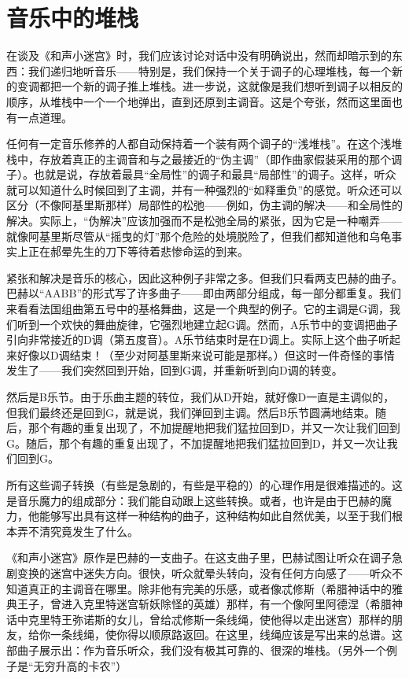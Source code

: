 \section{音乐中的堆栈}

在谈及《和声小迷宫》时，我们应该讨论对话中没有明确说出，然而却暗示到的东西：我们递归地听音乐——特别是，我们保持一个关于调子的心理堆栈，每一个新的变调都把一个新的调子推上堆栈。进一步说，这就像是我们想听到调子以相反的顺序，从堆栈中一个一个地弹出，直到还原到主调音。这是个夸张，然而这里面也有一点道理。

任何有一定音乐修养的人都自动保持着一个装有两个调子的“浅堆栈”。在这个浅堆栈中，存放着真正的主调音和与之最接近的“伪主调”（即作曲家假装采用的那个调子）。也就是说，存放着最具“全局性”的调子和最具“局部性”的调子。这样，听众就可以知道什么时候回到了主调，并有一种强烈的“如释重负”的感觉。听众还可以区分（不像阿基里斯那样）局部性的松弛——例如，伪主调的解决——和全局性的解决。实际上，“伪解决”应该加强而不是松弛全局的紧张，因为它是一种嘲弄——就像阿基里斯尽管从“摇曳的灯”那个危险的处境脱险了，但我们都知道他和乌龟事实上正在郝晕先生的刀下等待着悲惨命运的到来。

紧张和解决是音乐的核心，因此这种例子非常之多。但我们只看两支巴赫的曲子。巴赫以“AABB”的形式写了许多曲子——即由两部分组成，每一部分都重复。我们来看看法国组曲第五号中的基格舞曲，这是一个典型的例子。它的主调是G调，我们听到一个欢快的舞曲旋律，它强烈地建立起G调。然而，A乐节中的变调把曲子引向非常接近的D调（第五度音）。A乐节结束时是在D调上。实际上这个曲子听起来好像以D调结束！（至少对阿基里斯来说可能是那样。）但这时一件奇怪的事情发生了——我们突然回到开始，回到G调，并重新听到向D调的转变。

然后是B乐节。由于乐曲主题的转位，我们从D开始，就好像D一直是主调似的，但我们最终还是回到G，就是说，我们弹回到主调。然后B乐节圆满地结束。随后，那个有趣的重复出现了，不加提醒地把我们猛拉回到D，并又一次让我们回到G。随后，那个有趣的重复出现了，不加提醒地把我们猛拉回到D，并又一次让我们回到G。

所有这些调子转换（有些是急剧的，有些是平稳的）的心理作用是很难描述的。这是音乐魔力的组成部分：我们能自动跟上这些转换。或者，也许是由于巴赫的魔力，他能够写出具有这样一种结构的曲子，这种结构如此自然优美，以至于我们根本弄不清究竟发生了什么。

《和声小迷宫》原作是巴赫的一支曲子。在这支曲子里，巴赫试图让听众在调子急剧变换的迷宫中迷失方向。很快，听众就晕头转向，没有任何方向感了——听众不知道真正的主调音在哪里。除非他有完美的乐感，或者像忒修斯（希腊神话中的雅典王子，曾进入克里特迷宫斩妖除怪的英雄）那样，有一个像阿里阿德涅（希腊神话中克里特王弥诺斯的女儿，曾给忒修斯一条线绳，使他得以走出迷宫）那样的朋友，给你一条线绳，使你得以顺原路返回。在这里，线绳应该是写出来的总谱。这部曲子展示出：作为音乐听众，我们没有极其可靠的、很深的堆栈。（另外一个例子是“无穷升高的卡农”）

